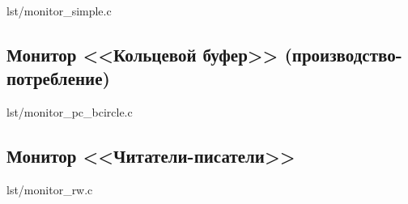 \begin{lstinputlisting}[
        label={lst:},
        caption={}
    ]{lst/monitor_simple.c}
\end{lstinputlisting}

\newpage

\subsection{Монитор <<Кольцевой буфер>> (производство-потребление)}

\begin{lstinputlisting}[
        label={lst:},
        caption={}
    ]{lst/monitor_pc_bcircle.c}
\end{lstinputlisting}

\newpage

\subsection{Монитор <<Читатели-писатели>>}

\begin{lstinputlisting}[
        label={lst:},
        caption={}
    ]{lst/monitor_rw.c}
\end{lstinputlisting}

